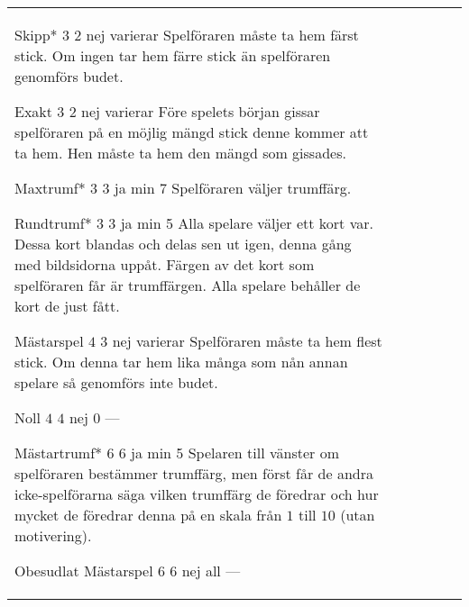 \begin{table}
\begin{center}
\begin{tabularx}{\textwidth}{lcccc|X}
				\standardBidItem%
				{Skipp*}
				{$3$}
				{$2$}
				{nej}
				{varierar}
				{%
					Spelföraren måste ta hem färst stick. Om ingen tar hem färre stick än spelföraren genomförs budet.
				}

				\standardBidItem%
				{Exakt}
				{$3$}
				{$2$}
				{nej}
				{varierar}
				{%
					Före spelets början gissar spelföraren på en möjlig mängd stick denne kommer att ta hem. Hen måste ta hem den mängd som gissades.
				}

				\standardBidItem%
				{Maxtrumf*}
				{$3$}
				{$3$}
				{ja}
				{min 7}
				{%
					Spelföraren väljer trumffärg.
				}

				\standardBidItem%
				{Rundtrumf*}
				{$3$}
				{$3$}
				{ja}
				{min 5}
				{%
					Alla spelare väljer ett kort var. Dessa kort blandas och delas sen ut igen, denna gång med bildsidorna uppåt. Färgen av det kort som spelföraren får är trumffärgen. Alla spelare behåller de kort de just fått.
				}

				\standardBidItem%
				{Mästarspel}
				{$4$}
				{$3$}
				{nej}
				{varierar}
				{%
					Spelföraren måste ta hem flest stick. Om denna tar hem lika många som nån annan spelare så genomförs inte budet.
				}

				\standardBidItem%
				{Noll}
				{$4$}
				{$4$}
				{nej}
				{0}
				{%
					---
				}

				\standardBidItem%
				{Mästartrumf*}
				{$6$}
				{$6$}
				{ja}
				{min 5}
				{%
					Spelaren till vänster om spelföraren bestämmer trumffärg, men först får de andra icke-spelförarna säga vilken trumffärg de föredrar och hur mycket de föredrar denna på en skala från $1$ till $10$ (utan motivering).
				}

				\standardBidItem%
				{Obesudlat Mästarspel}
				{$6$}
				{$6$}
				{nej}
				{all}
				{%
					---
				}
		\end{tabularx}
	\end{center}
\end{table}
